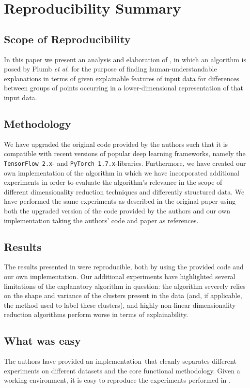 \section*{\centering Reproducibility Summary}

\subsection*{Scope of Reproducibility}
In this paper we present an analysis and elaboration of \cite{plumb2020explaining}, in which an algorithm is posed by Plumb \textit{et al}. for the purpose of finding human-understandable explanations in terms of given explainable features of input data for differences between groups of points occurring in a lower-dimensional representation of that input data.

\subsection*{Methodology}
We have upgraded the original code provided by the authors such that it is compatible with recent versions of popular deep learning frameworks, namely the \texttt{TensorFlow 2.x}- and \texttt{PyTorch 1.7.x}-libraries. Furthermore, we have created our own implementation of the algorithm in which we have incorporated additional experiments in order to evaluate the algorithm's relevance in the scope of different dimensionality reduction techniques and differently structured data. We have performed the same experiments as described in the original paper using both the upgraded version of the code provided by the authors and our own implementation taking the authors' code and paper as references.

\subsection*{Results}
The results presented in \cite{plumb2020explaining} were reproducible, both by using the provided code and our own implementation. Our additional experiments have highlighted several limitations of the explanatory algorithm in question: the algorithm severely relies on the shape and variance of the clusters present in the data (and, if applicable, the method used to label these clusters), and highly non-linear dimensionality reduction algorithms perform worse in terms of explainability.

\subsection*{What was easy}
The authors have provided an implementation\footnotemark~that cleanly separates different experiments on different datasets and the core functional methodology. Given a working environment, it is easy to reproduce the experiments performed in \cite{plumb2020explaining}.


